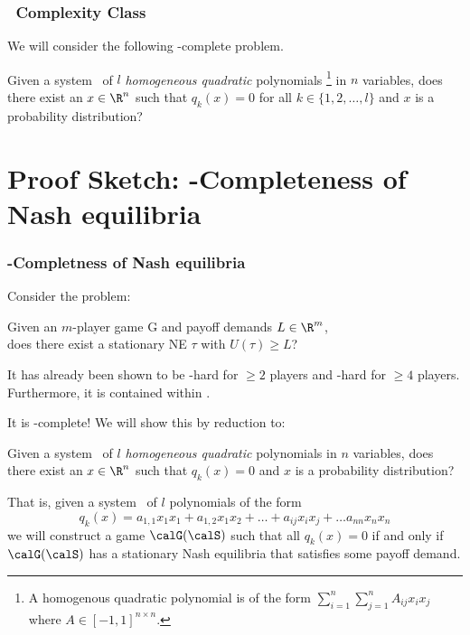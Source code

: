 \documentclass[english, aspectratio=169]{beamer}
\newcommand{\cHomQuad}{\cCLASS{HomQuad}}
\begin{document}
\begin{frame}
  \frametitle{\cETR\ Complexity Class}
  
  We will consider the following \cETR-complete problem.

  \begin{definition}[\cHomQuad]
    Given a system \calS\ of $l$ \emph{homogeneous quadratic} polynomials
    \footnote{ A homogenous quadratic polynomial is of the form $\sum_{i = 1}^n
      \sum_{j=1}^n A_{ij} x_{i} x_{j}$ where $A \in [ -1,1 ]^{n \times n}$.}
    in $n$ variables, does there exist an $x \in \R^n$ such that $q_k(x) = 0$
    for all $k \in \{1, 2, \dots, l\}$ and $x$ is a probability distribution?
  \end{definition}

\end{frame}

\section{Proof Sketch: \cETR-Completeness of Nash equilibria}

\begin{frame}
  \frametitle{\cETR-Completness of Nash equilibria}

  Consider the problem:

  \vspace{10pt}
  
  \begin{center}
    Given an $m$-player game G and payoff demands $L \in \R^m$, \\
    does there exist a stationary NE $\tau$ with $U(\tau) \geq L$?
  \end{center}

  \pause \vspace{10pt}

  It has already been shown to be \cNP-hard for $\geq 2$ players and
  \cSqrtSum-hard for $\geq 4$ players. Furthermore, it is contained within
  \cETR.
\end{frame}

\begin{frame}
  It is \cETR-complete! We will show this by reduction to:

  \begin{definition}[\cHomQuad]
    Given a system \calS\ of $l$ \emph{homogeneous quadratic} polynomials in $n$
    variables, does there exist an $x \in \R^n$ such that $q_k(x) = 0$ and $x$
    is a probability distribution?
  \end{definition}

  \pause \vspace{15pt}
  That is, given a system \calS\ of $l$ polynomials of the form
  \begin{equation*}
    q_k(x) = a_{1,1} x_1 x_1 + a_{1,2} x_1 x_2 + \dots + a_{ij} x_i x_j + \dots a_{n n} x_n x_n
  \end{equation*}
  we will construct a game $\calG(\calS)$ such that all $q_k(x) = 0$ if and only
  if $\calG(\calS)$ has a stationary Nash equilibria that satisfies some payoff
  demand.
\end{frame}
\end{document}

